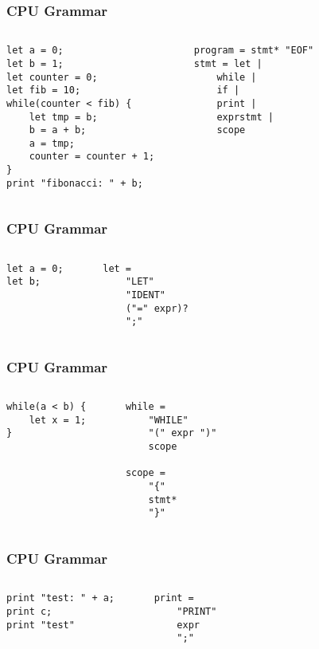 \documentclass{beamer}
\begin{document}
    \begin{frame}[fragile]
        \frametitle{CPU Grammar}
        \begin{columns}
        \begin{lstlisting}[]
let a = 0;
let b = 1;
let counter = 0;
let fib = 10;
while(counter < fib) {
    let tmp = b;
    b = a + b;
    a = tmp;
    counter = counter + 1;
}
print "fibonacci: " + b;
        \end{lstlisting}
        \pause
        \begin{verbatim}
    program = stmt* "EOF"
    stmt = let | 
        while | 
        if | 
        print | 
        exprstmt |
        scope
        \end{verbatim}
        \end{columns}
    \end{frame}

    \begin{frame}[fragile]
        \frametitle{CPU Grammar}
        \begin{columns}
        \begin{lstlisting}[]
let a = 0;
let b;
        \end{lstlisting}
        \pause
        \begin{verbatim}
    let = 
        "LET"
        "IDENT"
        ("=" expr)?
        ";"
        \end{verbatim}
        \end{columns}
    \end{frame}

    \begin{frame}[fragile]
        \frametitle{CPU Grammar}
        \begin{columns}
        \begin{lstlisting}[]
while(a < b) {
    let x = 1;
}
        \end{lstlisting}
        \pause
        \begin{verbatim}
    while = 
        "WHILE"
        "(" expr ")"
        scope
    
    scope = 
        "{"
        stmt*
        "}"
        \end{verbatim}
        \end{columns}
    \end{frame}

    \begin{frame}[fragile]
        \frametitle{CPU Grammar}
        \begin{columns}
        \begin{lstlisting}[]
print "test: " + a;
print c;
print "test"
        \end{lstlisting}
        \pause
        \begin{verbatim}
    print = 
        "PRINT"
        expr
        ";"
        \end{verbatim}
        \end{columns}
    \end{frame}
\end{document}
